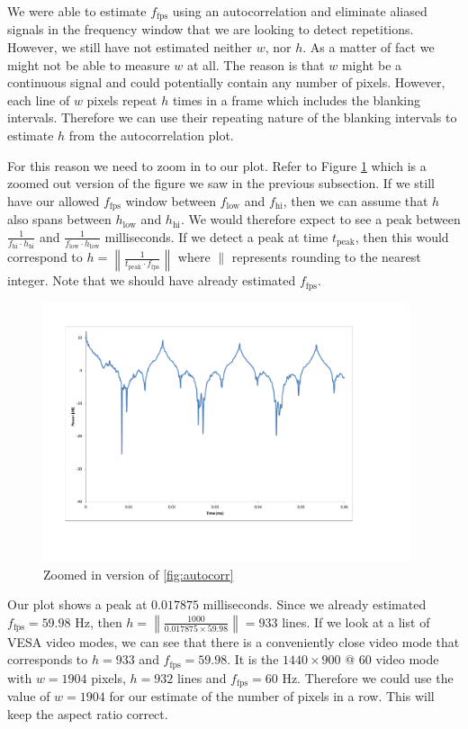 \documentclass[a4paper,12pt,twoside,openright]{report}
\begin{document}
We were able to estimate $f_\text{fps}$ using an autocorrelation and eliminate aliased signals in the frequency window that we are looking to detect repetitions. However, we still have not estimated neither $w$, nor $h$. As a matter of fact we might not be able to measure $w$ at all. The reason is that $w$ might be a continuous signal and could potentially contain any number of pixels. However, each line of $w$ pixels repeat $h$ times in a frame which includes the blanking intervals. Therefore we can use their repeating nature of the blanking intervals to estimate $h$ from the autocorrelation plot.

For this reason we need to zoom in to our plot. Refer to Figure \ref{fig:autocorr_zoomed} which is a zoomed out version of the figure we saw in the previous subsection. If we still have our allowed $f_\text{fps}$ window between $f_\text{low}$ and $f_\text{hi}$, then we can assume that $h$ also spans between $h_\text{low}$ and $h_\text{hi}$. We would therefore expect to see a peak between $\frac{1}{f_\text{hi} \cdot h_\text{hi}}$ and $\frac{1}{f_\text{low} \cdot h_\text{low}}$ milliseconds. If we detect a peak at time $t_\text{peak}$, then this would correspond to $h = \left\| \frac{1}{t_\text{peak} \cdot f_\text{fps}} \right\|$ where $\|$ represents rounding to the nearest integer. Note that we should have already estimated $f_\text{fps}$.

\begin{figure}[h]
\centering
  \includegraphics[width=0.96\textwidth]{autocorr_zoomed}
  \caption{Zoomed in version of \ref{fig:autocorr}}
  \label{fig:autocorr_zoomed}
\end{figure}

Our plot shows a peak at $0.017875$ milliseconds. Since we already estimated $f_\text{fps} = 59.98$ Hz, then $h = \left\| \frac{1000}{0.017875 \times 59.98} \right\| = 933$ lines. If we look at a list of VESA video modes, we can see that there is a conveniently close video mode that corresponds to $h = 933$ and $f_\text{fps} = 59.98$. It is the $1440 \times 900$ @ $60$ video mode with $w = 1904$ pixels, $h = 932$ lines and $f_\text{fps}=60$ Hz. Therefore we could use the value of $w = 1904$ for our estimate of the number of pixels in a row. This will keep the aspect ratio correct.
\end{document}

